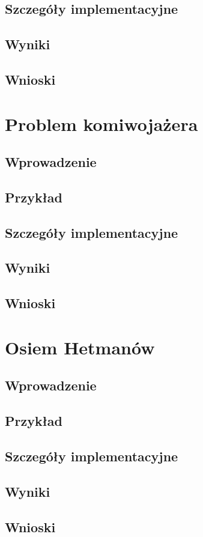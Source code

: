     \subsection{Szczegóły implementacyjne}
    \subsection{Wyniki}
    \subsection{Wnioski}
\section{Problem komiwojażera}
    \subsection{Wprowadzenie}
    \subsection{Przykład}
    \subsection{Szczegóły implementacyjne}
    \subsection{Wyniki}
    \subsection{Wnioski}
\section{Osiem Hetmanów}
    \subsection{Wprowadzenie}
    \subsection{Przykład}
    \subsection{Szczegóły implementacyjne}
    \subsection{Wyniki}
    \subsection{Wnioski}